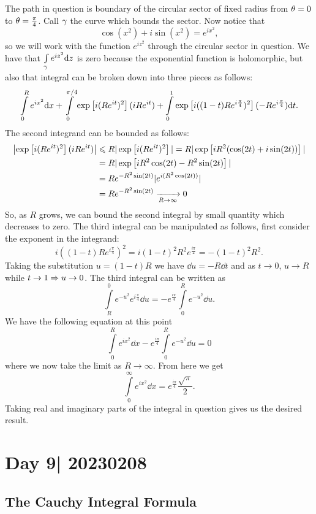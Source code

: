\documentclass[12pt]{memoir}
\begin{document}
\begin{ptcbr}
The path in question is boundary of the circular sector of fixed radius from $\theta=0$ to $\theta=\frac{\pi}{4}$. Call $\gamma$ the curve which bounds the sector. Now notice that 
$$\cos(x^2)+i\sin(x^2)=e^{ix^2},$$
so we will work with the function $e^{iz^2}$ through the circular sector in question. We have that $\int\limits_\gamma e^{iz^2}\dd z$ is zero because the exponential function is holomorphic, but also that integral can be broken down into three pieces as follows:
$$\int\limits_{0}^{R}e^{ix^2}\dd x+\int\limits_{0}^{\pi/4}\exp\left\lbrack i(Re^{it})^2\right\rbrack(iRe^{it})+\int\limits_{0}^{1}\exp\left\lbrack i((1-t)Re^{i\frac{\pi}{4}})^2\right\rbrack(-Re^{i\frac{\pi}{4}})\dd t.$$
The second integrand can be bounded as follows: 
\begin{align*}
    \left|\exp\left\lbrack i(Re^{it})^2\right\rbrack(iRe^{it})\right|&\leqslant R|\exp\left\lbrack i(Re^{it})^2\right\rbrack|=R|\exp\left\lbrack iR^2(\cos(2t)+i\sin(2t))\right\rbrack|\\
    &=R|\exp\left\lbrack iR^2\cos(2t)-R^2\sin(2t)\right\rbrack|\\
    &=Re^{-R^2\sin(2t)}|e^{i(R^2\cos(2t))}|\\
    &=Re^{-R^2\sin(2t)}\xrightarrow[R\to\infty]{}0
\end{align*}
So, as $R$ grows, we can bound the second integral by small quantity which decreases to zero. The third integral can be manipulated as follows, first consider the exponent in the integrand:
$$i((1-t)Re^{i\frac{\pi}{4}})^2=i(1-t)^2R^2e^{\frac{i\pi}{2}}=-(1-t)^2R^2.$$
Taking the substitution $u=(1-t)R$ we have $\dd u=-R\dd t$ and as $t\to 0$, $u\to R$ while $t\to 1\Rightarrow u\to 0$. The third integral can be written as 
$$\int\limits_{R}^{0}e^{-u^2}e^{i\frac{\pi}{4}}\dd u=-e^{\frac{i\pi}{4}}\int\limits_{0}^{R}e^{-u^2}\dd u.$$
We have the following equation at this point 
$$\int\limits_{0}^{R}e^{ix^2}\dd x-e^{\frac{i\pi}{4}}\int\limits_{0}^{R}e^{-u^2}\dd u=0$$
where we now take the limit as $R\to\infty$. From here we get 
$$\int\limits_{0}^{\infty}e^{ix^2}\dd x=e^{\frac{i\pi}{4}}\frac{\sqrt{\pi}}{2}.$$
Taking real and imaginary parts of the integral in question gives us the desired result.
\end{ptcbr}

\section{Day 9| 20230208}

\subsection{The Cauchy Integral Formula}
\end{document}
